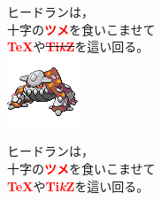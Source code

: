 \documentclass[fontsize=36pt]{jlreq}
\renewcommand{\emph}[1]{\textbf{\textcolor{red}{#1}}}
\begin{document}
\begin{center}
	ヒードランは，\\
	十字の\emph{ツメ}を食いこませて\\
	\emph{\TeX}や\sout{\emph{Ti\textit{k}Z}}を這い回る。\\[2cm]
	\includegraphics[scale=4]{Heatran.png}
\end{center}

\newpage

\begin{center}
	ヒードランは，\\
	十字の\emph{ツメ}を食いこませて\\
	\emph{\TeX}や\emph{Ti\textit{k}Z}を這い回る。\\[4cm]
	\tikzset{x=4pt,y=4pt}
	
\end{center}
\end{document}
